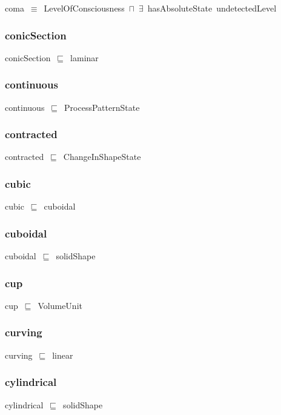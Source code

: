 \documentclass{article}
\begin{document}
coma~\ensuremath{\equiv}~LevelOfConsciousness~\ensuremath{\sqcap}~\ensuremath{\exists}~hasAbsoluteState~undetectedLevel

\subsubsection*{conicSection}

conicSection~\ensuremath{\sqsubseteq}~laminar~

\subsubsection*{continuous}

continuous~\ensuremath{\sqsubseteq}~ProcessPatternState~

\subsubsection*{contracted}

contracted~\ensuremath{\sqsubseteq}~ChangeInShapeState~

\subsubsection*{cubic}

cubic~\ensuremath{\sqsubseteq}~cuboidal~

\subsubsection*{cuboidal}

cuboidal~\ensuremath{\sqsubseteq}~solidShape~

\subsubsection*{cup}

cup~\ensuremath{\sqsubseteq}~VolumeUnit~

\subsubsection*{curving}

curving~\ensuremath{\sqsubseteq}~linear~

\subsubsection*{cylindrical}

cylindrical~\ensuremath{\sqsubseteq}~solidShape~
\end{document}
